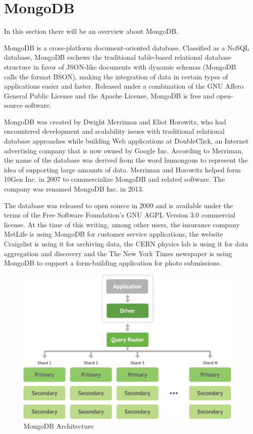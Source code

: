 \section{MongoDB}
\label{sec:TCH_mongodb}

In this section there will be an overview about MongoDB.

MongoDB is a cross-platform document-oriented database. Classified as a NoSQL database, 
MongoDB eschews the traditional table-based relational database structure in favor of JSON-like documents with dynamic schemas (MongoDB calls the format BSON), making the integration of data in certain types of applications easier and faster. Released under a combination of the GNU Affero General Public License and the Apache License, MongoDB is free and open-source software.

MongoDB was created by Dwight Merriman and Eliot Horowitz, who had encountered development and scalability issues with traditional relational database approaches while building Web applications at DoubleClick, an Internet advertising company that is now owned by Google Inc. According to Merriman, the name of the database was derived from the word humongous to represent the idea of supporting large amounts of data. Merriman and Horowitz helped form 10Gen Inc. in 2007 to commercialize MongoDB and related software. The company was renamed MongoDB Inc. in 2013. 

The database was released to open source in 2009 and is available under the terms of the Free Software Foundation's GNU AGPL Version 3.0 commercial license. At the time of this writing, among other users, the insurance company MetLife is using MongoDB for customer service applications, the website Craigslist is using it for archiving data, the CERN physics lab is using it for data aggregation and discovery and the The New York Times newspaper is using MongoDB to support a form-building application for photo submissions.


\begin {figure}[h]
\graphicspath{{images/chapter_TCH/}}
\includegraphics[width=\textwidth]{mongodb_1}
\caption{MongoDB Architecture}
\end {figure}